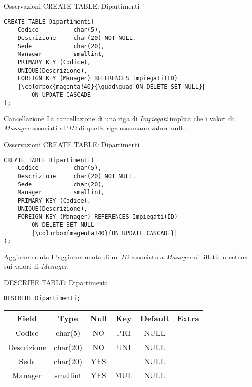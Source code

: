 %
\begin{frame}[fragile]{Osservazioni CREATE TABLE: Dipartimenti}
\vspace{-.6cm}
\begin{lstlisting}
CREATE TABLE Dipartimenti(
    Codice          char(5),
    Descrizione     char(20) NOT NULL,
    Sede            char(20),
    Manager         smallint,
    PRIMARY KEY (Codice),
    UNIQUE(Descrizione),
    FOREIGN KEY (Manager) REFERENCES Impiegati(ID)
    |\colorbox{magenta!40}{\quad\quad ON DELETE SET NULL}|
        ON UPDATE CASCADE
);    
\end{lstlisting}
\begin{block}{Cancellazione}
    La cancellazione di una riga di \textit{Impiegati} implica che i valori di \textit{Manager} associati all'\textit{ID} di quella riga assumano valore nullo.
\end{block}
\end{frame}
%
\begin{frame}[fragile]{Osservazioni CREATE TABLE: Dipartimenti}
\vspace{-.6cm}
\begin{lstlisting}
CREATE TABLE Dipartimenti(
    Codice          char(5),
    Descrizione     char(20) NOT NULL,
    Sede            char(20),
    Manager         smallint,
    PRIMARY KEY (Codice),
    UNIQUE(Descrizione),
    FOREIGN KEY (Manager) REFERENCES Impiegati(ID)
        ON DELETE SET NULL
        |\colorbox{magenta!40}{ON UPDATE CASCADE}|
);    
\end{lstlisting}
\begin{block}{Aggiornamento}
    L'aggiornamento di un \textit{ID} associato a \textit{Manager} si riflette a catena sui valori di \textit{Manager}.
\end{block}
\end{frame}
%
\begin{frame}[fragile]{DESCRIBE TABLE: Dipartimenti}
\begin{lstlisting}
DESCRIBE Dipartimenti;
\end{lstlisting}
\begin{tabular}{|c|c|c|c|c|c|}
    \hline
    \rowcolor{cyan!30} Field & Type & Null & Key & Default & Extra \\
    \hline
    Codice & char(5) & NO & PRI & NULL & \\ \hline
    Descrizione & char(20) & NO & UNI & NULL & \\ \hline
    Sede & char(20) & YES & & NULL & \\ \hline
    Manager & smallint & YES & MUL & NULL & \\ \hline
\end{tabular}
\end{frame}
